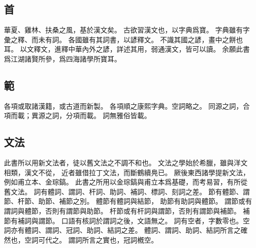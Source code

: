 \chapter{}
\section{首}
華夏、雞林、扶桑之風，基於漢文矣。
古欲習漢文也，以字典爲寶。
字典雖有字彙之釋、而未有詞。
各國雖有其詞書，以諺釋文。
不識其國之諺，畫中之餅也耳。
以文釋文，進釋中華內外之諺，詳述其用，弱通漢文，皆可以讀。
余願此書爲江湖諸賢所參，爲四海諸學所寶耳。
\section{範}
各項或取諸漢籍，或古道而新製。
各項順之康熙字典。空詞略之。
同源之詞，合項而載；異源之詞，分項而載。
詞無雅俗皆載。
\section{文法}
此書所以用新文法者，徒以舊文法之不調不和也。
文法之學始於希臘，雖與洋文相類，漢文不從，
近者雖借拉丁文法，而斷鶴續鳧已。
厥後東西諸學提新文法，例如甫立本、金琮鎬\autocite{PulleyblankYang:2005}\autocite{Kim:2019}。
此書之所用以金琮鎬與甫立本爲基礎，而考易習，有所從舊文法\autocite{Kim:2019}。
詞有體詞、謂詞、杆詞、助詞、補詞、標詞、刻詞之差\autocite{Kim:2019}。
節有體節、謂節、杆節、助節、補節之別\autocite{Kim:2019}。
體節有體詞與結節，
助節有助詞與體節\autocite{Kim:2019}。
謂節或有謂詞與體節，否則有謂節與助節\autocite{Kim:2019}。
杆節或有杆詞與謂節，否則有謂節與補節\autocite{Kim:2019}。
補節有補詞與謂節\autocite{Kim:2019}。
口語有核詞於謂詞之後，文語無之。
詞有空者，字數零也。空詞亦有體詞、謂詞、冠詞、助詞、結詞之差\autocite{Kim:2019}。
體詞、謂詞、助詞、結詞所言之確然也，空詞可代之\autocite{Kim:2019}。
謂詞所言之實也，冠詞槪空。
